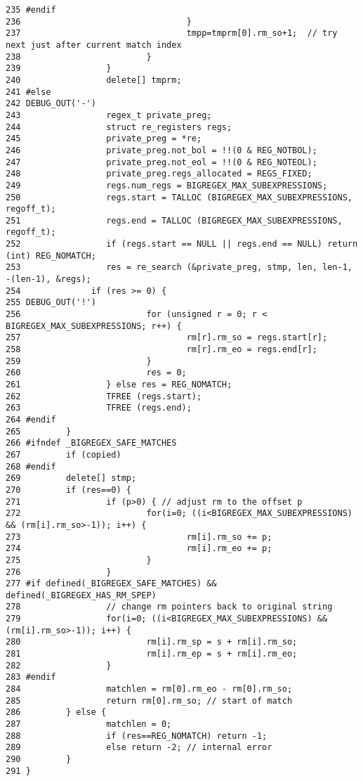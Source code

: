\begin{verbatim}
235 #endif
236                                 }
237                                 tmpp=tmprm[0].rm_so+1;  // try next just after current match index
238                         }
239                 }
240                 delete[] tmprm;
241 #else
242 DEBUG_OUT('-')
243                 regex_t private_preg;
244                 struct re_registers regs;
245                 private_preg = *re;
246                 private_preg.not_bol = !!(0 & REG_NOTBOL);
247                 private_preg.not_eol = !!(0 & REG_NOTEOL);
248                 private_preg.regs_allocated = REGS_FIXED;
249                 regs.num_regs = BIGREGEX_MAX_SUBEXPRESSIONS;
250                 regs.start = TALLOC (BIGREGEX_MAX_SUBEXPRESSIONS, regoff_t);
251                 regs.end = TALLOC (BIGREGEX_MAX_SUBEXPRESSIONS, regoff_t);
252                 if (regs.start == NULL || regs.end == NULL) return (int) REG_NOMATCH;
253                 res = re_search (&private_preg, stmp, len, len-1, -(len-1), &regs);
254              if (res >= 0) {
255 DEBUG_OUT('!')
256                         for (unsigned r = 0; r < BIGREGEX_MAX_SUBEXPRESSIONS; r++) {
257                                 rm[r].rm_so = regs.start[r];
258                                 rm[r].rm_eo = regs.end[r];
259                         }
260                         res = 0;
261                 } else res = REG_NOMATCH;
262                 TFREE (regs.start);
263                 TFREE (regs.end);
264 #endif
265         }
266 #ifndef _BIGREGEX_SAFE_MATCHES
267         if (copied)
268 #endif
269         delete[] stmp;
270         if (res==0) {
271                 if (p>0) { // adjust rm to the offset p
272                         for(i=0; ((i<BIGREGEX_MAX_SUBEXPRESSIONS) && (rm[i].rm_so>-1)); i++) {
273                                 rm[i].rm_so += p;
274                                 rm[i].rm_eo += p;
275                         }
276                 }
277 #if defined(_BIGREGEX_SAFE_MATCHES) && defined(_BIGREGEX_HAS_RM_SPEP)
278                 // change rm pointers back to original string
279                 for(i=0; ((i<BIGREGEX_MAX_SUBEXPRESSIONS) && (rm[i].rm_so>-1)); i++) {
280                         rm[i].rm_sp = s + rm[i].rm_so;
281                         rm[i].rm_ep = s + rm[i].rm_eo;
282                 }
283 #endif
284                 matchlen = rm[0].rm_eo - rm[0].rm_so;
285                 return rm[0].rm_so; // start of match
286         } else {
287                 matchlen = 0;
288                 if (res==REG_NOMATCH) return -1;
289                 else return -2; // internal error
290         }
291 }
\end{verbatim}\normalsize 
{}
